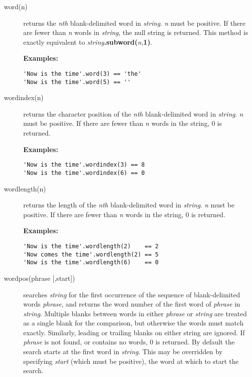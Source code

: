 \begin{description}
\item[word(n)]\label{refword}
returns the \emph{n}\emph{th} blank-delimited word in
\emph{string}.
\emph{n} must be positive.
If there are fewer than \emph{n} words in \emph{string}, the
null string is returned.
This method is exactly equivalent to
\emph{string}\textbf{.subword(}\emph{n},\textbf{1)}.
 
\textbf{Examples:}
\begin{lstlisting}
'Now is the time'.word(3) == 'the'
'Now is the time'.word(5) == ''
\end{lstlisting}

\item[wordindex(n)]\label{refwordind}
returns the character position of the \emph{n}\emph{th}
blank-delimited word in \emph{string}.
\emph{n} must be positive.
If there are fewer than \emph{n} words in the string, 0 is returned.
 
\textbf{Examples:}
\begin{lstlisting}
'Now is the time'.wordindex(3) == 8
'Now is the time'.wordindex(6) == 0
\end{lstlisting}

\item[wordlength(n)]\label{refwordlen}
returns the length of the \emph{n}\emph{th} blank-delimited word in
\emph{string}.
\emph{n} must be positive.
If there are fewer than \emph{n} words in the string, 0 is returned.
 
\textbf{Examples:}
\begin{lstlisting}
'Now is the time'.wordlength(2)    == 2
'Now comes the time'.wordlength(2) == 5
'Now is the time'.wordlength(6)    == 0
\end{lstlisting}

\item[wordpos(phrase [,start{]})]\label{refwordpos}
searches \emph{string} for the first occurrence of the sequence
of blank-delimited words \emph{phrase}, and returns the word number
of the first word of \emph{phrase} in \emph{string}.  Multiple
blanks between words in either \emph{phrase} or \emph{string}
are treated as a single blank for the comparison, but otherwise the
words must match exactly.  Similarly, leading or trailing blanks on
either string are ignored.
If \emph{phrase} is not found, or contains no words, 0 is returned.
 By default the search starts at the first word in \emph{string}.
This may be overridden by specifying \emph{start} (which must be
positive), the word at which to start the search.
 

\end{description}
